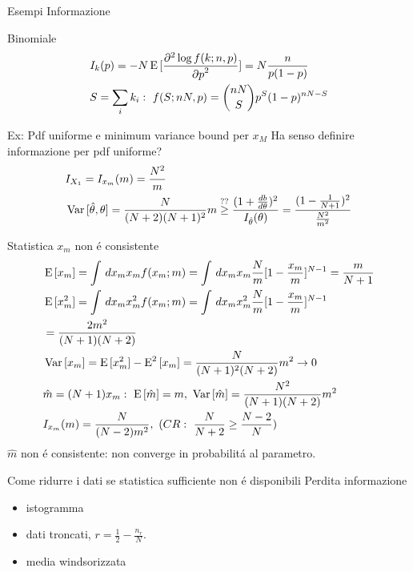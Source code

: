 \documentclass[asd-beamer.tex]{subfiles}%
\begin{document}
\begin{frame}{Esempi Informazione}
\begin{block}{Binomiale}
\begin{align*}
&I_k(p)=-N\E{[\PtwoDy{p}{\log{f(k;n,p)}}]}=N\frac{n}{p(1-p)}\\
&S=\sum_ik_i:\ f(S;nN,p)=\binom{nN}{S}p^S(1-p)^{nN-S}
\end{align*}
\end{block}
\begin{block}{Ex: Pdf uniforme e minimum variance bound per $x_M$}
Ha senso definire informazione per pdf uniforme?
\begin{align*}
&I_{X_1}=I_{x_m}(m)=\frac{N^2}{m}\\
&\var{[\hat{\theta},\theta]}=\frac{N}{(N+2)(N+1)^2}m\overset{??}{\geq}\frac{(1+\TDy{\theta}{b})^2}{I_{\hat{\theta}}(\theta)}=\frac{(1-\frac{1}{N+1})^2}{\frac{N^2}{m^2}}
\end{align*}
\end{block}
\framebreak
\begin{block}{Statistica $x_m$ non \'e consistente}
\begin{align*}
&\E{[x_m]}=\int\,dx_mx_mf(x_m;m)=\int\,dx_mx_m\frac{N}{m}[1-\frac{x_m}{m}]^{N-1}=\frac{m}{N+1}\\
&\E{[x_m^2]}=\int\,dx_mx_m^2f(x_m;m)=\int\,dx_mx_m^2\frac{N}{m}[1-\frac{x_m}{m}]^{N-1}\\
&=\frac{2m^2}{(N+1)(N+2)}\\
&\var{[x_m]}=\E{[x_m^2]}-\E^2{[x_m]}=\frac{N}{(N+1)^2(N+2)}m^2\to0\\
&\hat{m}=(N+1)x_m:\ \E{[\hat{m}]}=m,\ \var{[\hat{m}]}=\frac{N^2}{(N+1)(N+2)}m^2\\
&I_{x_m}(m)=\frac{N}{(N-2)m^2},\ (CR:\ \frac{N}{N+2}\geq\frac{N-2}{N})
\end{align*}
$\hat{m}$ non \'e consistente: non converge in probabilit\'a al parametro.
\end{block}
\end{frame}

\begin{frame}{Come ridurre i dati se statistica sufficiente non \'e disponibili}
Perdita informazione
\begin{itemize}
\item istogramma
\item dati troncati, $r=\frac{1}{2}-\frac{n_r}{N}$.
\item media windsorizzata
\end{itemize}
\end{frame}
\end{document}
